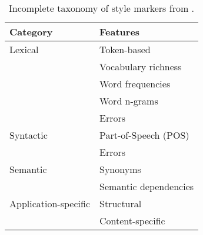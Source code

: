 \begin{table}[]
    \centering
    \caption{Incomplete taxonomy of style markers from \citep{stamatatos_survey_2009}.}
    \label{tab:stylometric_features}
 
    \begin{tabular}{@{}ll@{}} %
    \toprule
    \textbf{Category} & \textbf{Features} \\ 
    \midrule
    Lexical & Token-based \\ %
     & Vocabulary richness  \\
     & Word frequencies  \\
     & Word n-grams  \\
     & Errors \\
    Syntactic & Part-of-Speech (POS)  \\
     & Errors  \\
    Semantic & Synonyms \\
     & Semantic dependencies \\
    Application-specific & Structural  \\
     & Content-specific\\
     \bottomrule
    \end{tabular}%

\end{table}